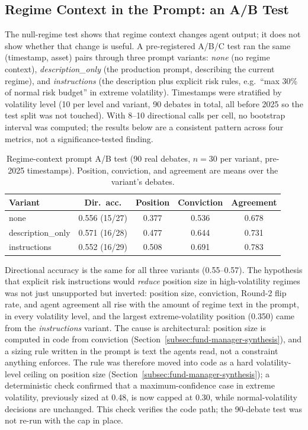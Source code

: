 \subsection{Regime Context in the Prompt: an A/B Test}
\label{subsec:agent-instructions-ab}

The null-regime test shows that regime context changes agent output; it does not show whether that change is useful. A pre-registered A/B/C test ran the same (timestamp, asset) pairs through three prompt variants: \emph{none} (no regime context), \emph{description\_only} (the production prompt, describing the current regime), and \emph{instructions} (the description plus explicit risk rules, e.g.\ ``max 30\% of normal risk budget'' in extreme volatility). Timestamps were stratified by volatility level (10 per level and variant, 90 debates in total, all before 2025 so the test split was not touched). With 8--10 directional calls per cell, no bootstrap interval was computed; the results below are a consistent pattern across four metrics, not a significance-tested finding.

\begin{table}[H]
\centering
\small
\caption{Regime-context prompt A/B test (90 real debates, $n=30$ per variant, pre-2025 timestamps). Position, conviction, and agreement are means over the variant's debates.}
\label{tab:agent-instructions-ab}
\begin{tabular}{|l|c|c|c|c|}
\hline
\textbf{Variant} & \textbf{Dir.\ acc.} & \textbf{Position} & \textbf{Conviction} & \textbf{Agreement} \\
\hline
none & 0.556 (15/27) & 0.377 & 0.536 & 0.678 \\
\hline
description\_only & 0.571 (16/28) & 0.477 & 0.644 & 0.731 \\
\hline
instructions & 0.552 (16/29) & 0.508 & 0.691 & 0.783 \\
\hline
\end{tabular}
\normalsize
\end{table}

Directional accuracy is the same for all three variants (0.55--0.57). The hypothesis that explicit risk instructions would \emph{reduce} position size in high-volatility regimes was not just unsupported but inverted: position size, conviction, Round-2 flip rate, and agent agreement all rise with the amount of regime text in the prompt, in every volatility level, and the largest extreme-volatility position (0.350) came from the \emph{instructions} variant. The cause is architectural: position size is computed in code from conviction (Section~\ref{subsec:fund-manager-synthesis}), and a sizing rule written in the prompt is text the agents read, not a constraint anything enforces. The rule was therefore moved into code as a hard volatility-level ceiling on position size (Section~\ref{subsec:fund-manager-synthesis}); a deterministic check confirmed that a maximum-confidence case in extreme volatility, previously sized at 0.48, is now capped at 0.30, while normal-volatility decisions are unchanged. This check verifies the code path; the 90-debate test was not re-run with the cap in place.

